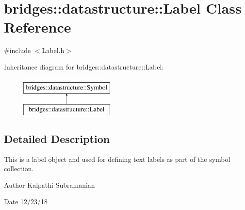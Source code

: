 \hypertarget{classbridges_1_1datastructure_1_1_label}{}\section{bridges\+:\+:datastructure\+:\+:Label Class Reference}
\label{classbridges_1_1datastructure_1_1_label}


{\ttfamily \#include $<$Label.\+h$>$}

Inheritance diagram for bridges\+:\+:datastructure\+:\+:Label\+:\begin{figure}[H]
\begin{center}
\leavevmode
\includegraphics[height=2.000000cm]{classbridges_1_1datastructure_1_1_label}
\end{center}
\end{figure}


\subsection{Detailed Description}
This is a label object and used for defining text labels as part of the symbol collection. 

\begin{DoxyAuthor}{Author}
Kalpathi Subramanian 
\end{DoxyAuthor}
\begin{DoxyDate}{Date}
12/23/18 
\end{DoxyDate}
